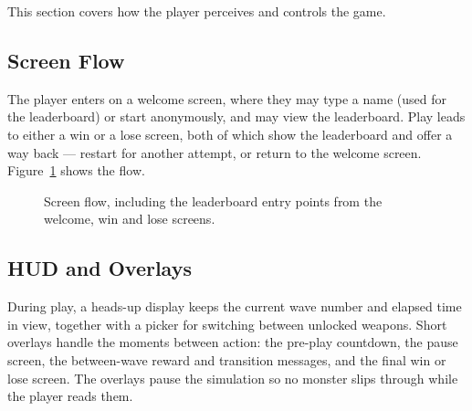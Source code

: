 \documentclass[12pt,a4paper]{report}
\begin{document}
This section covers how the player perceives and controls the game.

\subsection{Screen Flow}

The player enters on a welcome screen, where they may type a name (used for the
leaderboard) or start anonymously, and may view the leaderboard. Play leads to
either a win or a lose screen, both of which show the leaderboard and offer a way
back --- restart for another attempt, or return to the welcome screen.
Figure~\ref{fig:flow} shows the flow.

\begin{figure}[htbp]
\centering
{}
\caption{Screen flow, including the leaderboard entry points from the welcome,
win and lose screens.}
\label{fig:flow}
\end{figure}

\subsection{HUD and Overlays}

During play, a heads-up display keeps the current wave number and elapsed time
in view, together with a picker for switching between unlocked weapons. Short
overlays handle the moments between action: the pre-play countdown, the pause
screen, the between-wave reward and transition messages, and the final win or
lose screen. The overlays pause the simulation so no monster slips through while
the player reads them.
\end{document}
